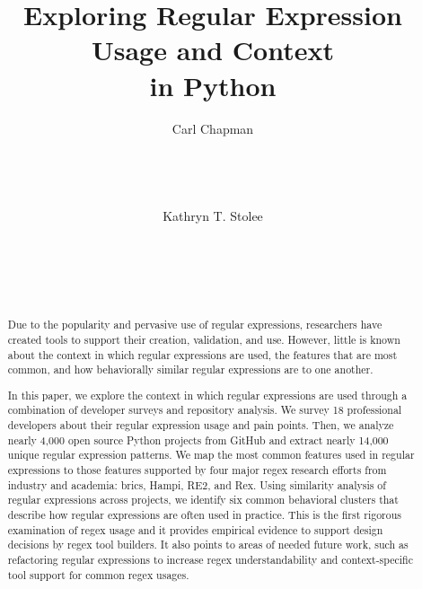 \documentclass{sig-alternate-05-2015}
\begin{document}
\toappear{}

\title{Exploring  Regular Expression Usage and Context\\ in Python}

\author{
\alignauthor
Carl Chapman\\
      \\
      \\
      \\
     \\
\alignauthor
Kathryn T. Stolee\\
      \\
      \\
      \\
     \\
}
\maketitle


\begin{abstract}
Due to the popularity and pervasive use of regular expressions, researchers have created tools to support their creation, validation, and use. However, little is known about the context in which regular expressions are used, the features that are most common, and how behaviorally similar regular expressions are to one another.

In this paper, we explore the context in which regular expressions are used through a combination of developer surveys and repository analysis. We survey 18 professional developers about their regular expression usage and pain points. Then, we analyze nearly 4,000 open source Python projects from GitHub and extract nearly 14,000 unique regular expression patterns. We  map the most common features used in regular expressions to those features supported by four major regex research efforts from industry and academia: brics, Hampi, RE2, and Rex. Using similarity analysis of regular expressions across projects, we identify six common behavioral clusters that describe how regular expressions are often used in practice. This is the first rigorous examination of regex usage and it provides empirical evidence to support design decisions by regex tool builders. It also points to areas of needed future work, such as refactoring regular expressions to increase regex understandability and context-specific tool support for common regex usages.
\end{abstract}
\end{document}
